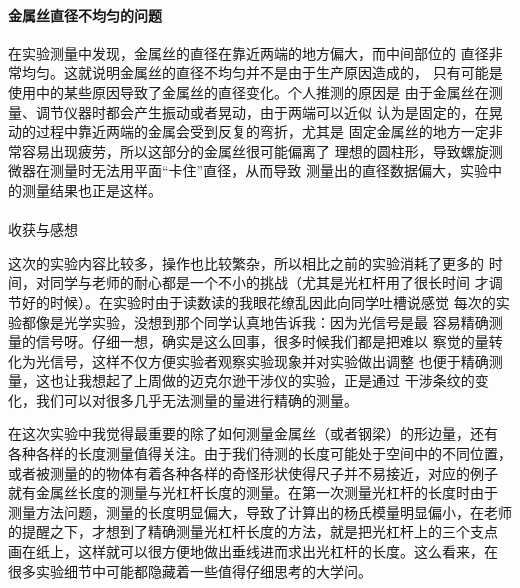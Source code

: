 \documentclass[a4paper]{ctexart}
\makeatletter
\renewcommand{\section}{\@startsection{section}{1}{0mm}
	{-\baselineskip}{0.5\baselineskip}{\bf\leftline}}
\makeatother
\begin{document}
	\paragraph{金属丝直径不均匀的问题}
	在实验测量中发现，金属丝的直径在靠近两端的地方偏大，而中间部位的
	直径非常均匀。这就说明金属丝的直径不均匀并不是由于生产原因造成的，
	只有可能是使用中的某些原因导致了金属丝的直径变化。个人推测的原因是
	由于金属丝在测量、调节仪器时都会产生振动或者晃动，由于两端可以近似
	认为是固定的，在晃动的过程中靠近两端的金属会受到反复的弯折，尤其是
	固定金属丝的地方一定非常容易出现疲劳，所以这部分的金属丝很可能偏离了
	理想的圆柱形，导致螺旋测微器在测量时无法用平面“卡住”直径，从而导致
	测量出的直径数据偏大，实验中的测量结果也正是这样。\\
	\\
	\section{\large{收获与感想}}
	\par 
	这次的实验内容比较多，操作也比较繁杂，所以相比之前的实验消耗了更多的
	时间，对同学与老师的耐心都是一个不小的挑战（尤其是光杠杆用了很长时间
	才调节好的时候）。在实验时由于读数读的我眼花缭乱因此向同学吐槽说感觉
	每次的实验都像是光学实验，没想到那个同学认真地告诉我：因为光信号是最
	容易精确测量的信号呀。仔细一想，确实是这么回事，很多时候我们都是把难以
	察觉的量转化为光信号，这样不仅方便实验者观察实验现象并对实验做出调整
	也便于精确测量，这也让我想起了上周做的迈克尔逊干涉仪的实验，正是通过
	干涉条纹的变化，我们可以对很多几乎无法测量的量进行精确的测量。
	\par 
	在这次实验中我觉得最重要的除了如何测量金属丝（或者钢梁）的形边量，还有
	各种各样的长度测量值得关注。由于我们待测的长度可能处于空间中的不同位置，
	或者被测量的的物体有着各种各样的奇怪形状使得尺子并不易接近，对应的例子
	就有金属丝长度的测量与光杠杆长度的测量。在第一次测量光杠杆的长度时由于
	测量方法问题，测量的长度明显偏大，导致了计算出的杨氏模量明显偏小，在老师
	的提醒之下，才想到了精确测量光杠杆长度的方法，就是把光杠杆上的三个支点
	画在纸上，这样就可以很方便地做出垂线进而求出光杠杆的长度。这么看来，在
	很多实验细节中可能都隐藏着一些值得仔细思考的大学问。
\end{document}
